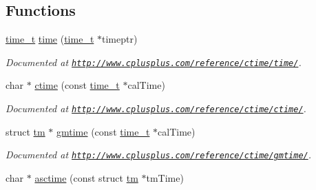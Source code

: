 \subsection*{Functions}
\begin{DoxyCompactItemize}
\item 
\hypertarget{group__time_ga8038cf2bfae47bdf6942741c58a2c530}{\hyperlink{group__time_ga824afaa48b313f905546cf45822800fc}{time\-\_\-t} \hyperlink{group__time_ga8038cf2bfae47bdf6942741c58a2c530}{time} (\hyperlink{group__time_ga824afaa48b313f905546cf45822800fc}{time\-\_\-t} $\ast$timeptr)}\label{group__time_ga8038cf2bfae47bdf6942741c58a2c530}

\begin{DoxyCompactList}\small\item\em Documented at \href{http://www.cplusplus.com/reference/ctime/time/}{\tt http\-://www.\-cplusplus.\-com/reference/ctime/time/}. \end{DoxyCompactList}\item 
\hypertarget{group__time_gab184b6fffe668a5a8ea553b9c7b6a12e}{char $\ast$ \hyperlink{group__time_gab184b6fffe668a5a8ea553b9c7b6a12e}{ctime} (const \hyperlink{group__time_ga824afaa48b313f905546cf45822800fc}{time\-\_\-t} $\ast$cal\-Time)}\label{group__time_gab184b6fffe668a5a8ea553b9c7b6a12e}

\begin{DoxyCompactList}\small\item\em Documented at \href{http://www.cplusplus.com/reference/ctime/ctime/}{\tt http\-://www.\-cplusplus.\-com/reference/ctime/ctime/}. \end{DoxyCompactList}\item 
\hypertarget{group__time_gad8edabcf1742ba5c171533f0ebd8284e}{struct \hyperlink{structtm}{tm} $\ast$ \hyperlink{group__time_gad8edabcf1742ba5c171533f0ebd8284e}{gmtime} (const \hyperlink{group__time_ga824afaa48b313f905546cf45822800fc}{time\-\_\-t} $\ast$cal\-Time)}\label{group__time_gad8edabcf1742ba5c171533f0ebd8284e}

\begin{DoxyCompactList}\small\item\em Documented at \href{http://www.cplusplus.com/reference/ctime/gmtime/}{\tt http\-://www.\-cplusplus.\-com/reference/ctime/gmtime/}. \end{DoxyCompactList}\item 
\hypertarget{group__time_ga77ffc012f51d8c41356e76628da706c9}{char $\ast$ \hyperlink{group__time_ga77ffc012f51d8c41356e76628da706c9}{asctime} (const struct \hyperlink{structtm}{tm} $\ast$tm\-Time)}\label{group__time_ga77ffc012f51d8c41356e76628da706c9}


\end{DoxyCompactItemize}
